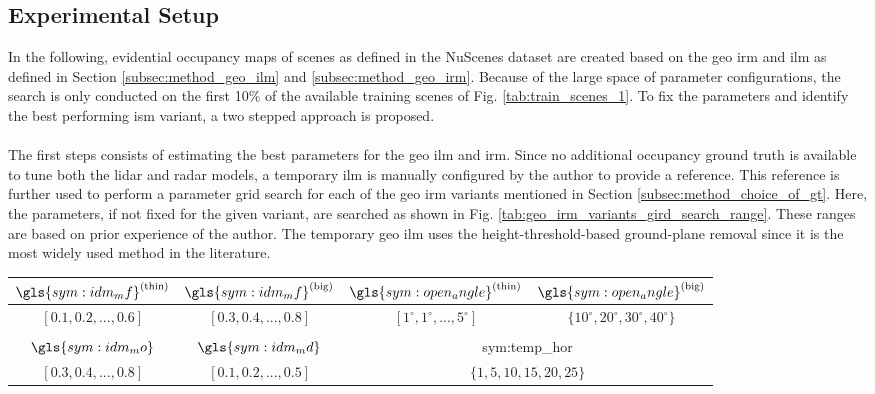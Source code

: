 \subsection{Experimental Setup}
\label{subsec:exp_setup_gt}
In the following, evidential occupancy maps of scenes as defined in the NuScenes dataset are created based on the geo \gls{irm} and \gls{ilm} as defined in Section \ref{subsec:method_geo_ilm} and \ref{subsec:method_geo_irm}. Because of the large space of parameter configurations, the search is only conducted on the first 10\% of the available training scenes of Fig. \ref{tab:train_scenes_1}. To fix the parameters and identify the best performing \gls{ism} variant, a two stepped approach is proposed.
\\\\
The first steps consists of estimating the best parameters for the geo \gls{ilm} and \gls{irm}. Since no additional occupancy ground truth is available to tune both the lidar and radar models, a temporary \gls{ilm} is manually configured by the author to provide a reference. This reference is further used to perform a parameter grid search for each of the geo \gls{irm} variants mentioned in Section \ref{subsec:method_choice_of_gt}. Here, the parameters, if not fixed for the given variant, are searched as shown in Fig. \ref{tab:geo_irm_variants_gird_search_range}. These ranges are based on prior experience of the author. The temporary geo \gls{ilm} uses the height-threshold-based ground-plane removal since it is the most widely used method in the literature.
\begin{center}
	\begin{tabular}{c|c|c|c}
		$\gls{sym:idm_mf}^{(\text{thin})}$ & $\gls{sym:idm_mf}^{(\text{big})}$ & $\gls{sym:open_angle}^{(\text{\scriptsize thin})}$ & $\gls{sym:open_angle}^{(\text{\scriptsize big})}$\\
		\hline
		$[0.1,0.2,...,0.6]$ & $[0.3,0.4,...,0.8]$ & $[1^{\circ},1^{\circ},...,5^{\circ}]$ & $\{10^{\circ}, 20^{\circ},30^{\circ},40^{\circ}\}$\\
		\multicolumn{4}{c}{}\\
		$\gls{sym:idm_mo}$ & $\gls{sym:idm_md}$ & \multicolumn{2}{c}{\gls{sym:temp_hor}}\\
		\hline
		$[0.3, 0.4, ..., 0.8]$ & $[0.1, 0.2, ..., 0.5]$ & \multicolumn{2}{c}{$\{1,5,10,15,20,25\}$}
	\end{tabular}
\end{center}
